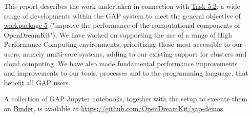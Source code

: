 This report describes the work undertaken in connection with
\href{https://github.com/OpenDreamKit/OpenDreamKit/issues/100}{Task
5.2}: a wide range of developments within the GAP system to meet the
general objective of
\href{https://github.com/OpenDreamKit/OpenDreamKit/labels/WP5}{workpackage
5} ("improve the performance of the computational components of
OpenDreamKit"). We have worked on supporting the use of a range of High
Performance Computing environments, prioritizing those most accessible
to our users, namely multi-core systems, adding to our existing support
for clusters and cloud computing. We have also made fundamental
performance improvements and improvements to our tools, processes and to
the programming language, that benefit all GAP users.

A collection of GAP Jupyter notebooks, together with the setup to
execute them on \href{https://mybinder.org/}{Binder}, is available at
\url{https://github.com/OpenDreamKit/gap-demos}.
